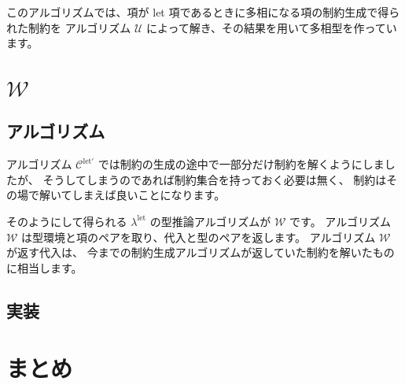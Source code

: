 このアルゴリズムでは、項が let 項であるときに多相になる項の制約生成で得られた制約を
アルゴリズム $\mathcal U$ によって解き、その結果を用いて多相型を作っています。

\section{$\mathcal W$}

\subsection{アルゴリズム}

アルゴリズム $\mathcal C^\mathrm{let'}$ では制約の生成の途中で一部分だけ制約を解くようにしましたが、
そうしてしまうのであれば制約集合を持っておく必要は無く、
制約はその場で解いてしまえば良いことになります。

そのようにして得られる $\lambda^\mathrm{let}$ の型推論アルゴリズムが $\mathcal W$ です。
アルゴリズム $\mathcal W$ は型環境と項のペアを取り、代入と型のペアを返します。
アルゴリズム $\mathcal W$ が返す代入は、
今までの制約生成アルゴリズムが返していた制約を解いたものに相当します。



\subsection{実装}



\section{まとめ}



